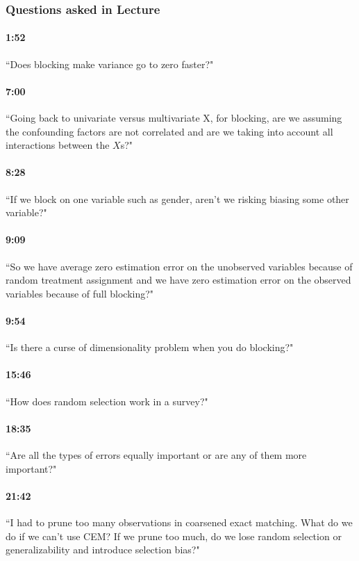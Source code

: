\documentclass[11pt]{article}
\begin{document}
\subsubsection{Questions asked in Lecture}

\paragraph{1:52} ``Does blocking make variance go to zero faster?"

\paragraph{7:00} ``Going back to univariate versus multivariate X, for blocking, are we assuming the confounding factors are not correlated and are we taking into account all interactions between the $X$s?"

\paragraph{8:28} ``If we block on one variable such as gender, aren't we risking biasing some other variable?"

\paragraph{9:09} ``So we have average zero estimation error on the unobserved variables because of random treatment assignment and we have zero estimation error on the observed variables because of full blocking?"

\paragraph{9:54} ``Is there a curse of dimensionality problem when you do blocking?"

\paragraph{15:46} ``How does random selection work in a survey?"

\paragraph{18:35} ``Are all the types of errors equally important or are any of them more important?"

\paragraph{21:42} ``I had to prune too many observations in coarsened exact matching.  What do we do if we can't use CEM?  If we prune too much, do we lose random selection or generalizability and introduce selection bias?"
\end{document}
